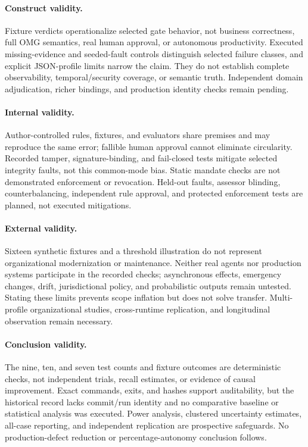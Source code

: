 \documentclass[11pt,a4paper]{article}
\begin{document}
\paragraph{Construct validity.} Fixture verdicts operationalize selected gate behavior, not business correctness, full OMG semantics, real human approval, or autonomous productivity. Executed missing-evidence and seeded-fault controls distinguish selected failure classes, and explicit JSON-profile limits narrow the claim. They do not establish complete observability, temporal/security coverage, or semantic truth. Independent domain adjudication, richer bindings, and production identity checks remain pending.

\paragraph{Internal validity.} Author-controlled rules, fixtures, and evaluators share premises and may reproduce the same error; fallible human approval cannot eliminate circularity. Recorded tamper, signature-binding, and fail-closed tests mitigate selected integrity faults, not this common-mode bias. Static mandate checks are not demonstrated enforcement or revocation. Held-out faults, assessor blinding, counterbalancing, independent rule approval, and protected enforcement tests are planned, not executed mitigations.

\paragraph{External validity.} Sixteen synthetic fixtures and a threshold illustration do not represent organizational modernization or maintenance. Neither real agents nor production systems participate in the recorded checks; asynchronous effects, emergency changes, drift, jurisdictional policy, and probabilistic outputs remain untested. Stating these limits prevents scope inflation but does not solve transfer. Multi-profile organizational studies, cross-runtime replication, and longitudinal observation remain necessary.

\paragraph{Conclusion validity.} The nine, ten, and seven test counts and fixture outcomes are deterministic checks, not independent trials, recall estimates, or evidence of causal improvement. Exact commands, exits, and hashes support auditability, but the historical record lacks commit/run identity and no comparative baseline or statistical analysis was executed. Power analysis, clustered uncertainty estimates, all-case reporting, and independent replication are prospective safeguards. No production-defect reduction or percentage-autonomy conclusion follows.
\end{document}
